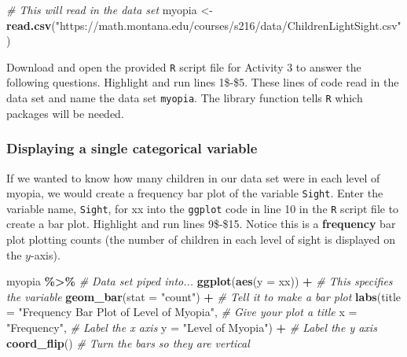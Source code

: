 \documentclass[
]{report}
\newenvironment{Shaded}{\begin{snugshade}}{\end{snugshade}}
\newcommand{\CommentTok}[1]{\textcolor[rgb]{0.56,0.35,0.01}{\textit{#1}}}
\newcommand{\DataTypeTok}[1]{\textcolor[rgb]{0.13,0.29,0.53}{#1}}
\newcommand{\KeywordTok}[1]{\textcolor[rgb]{0.13,0.29,0.53}{\textbf{#1}}}
\newcommand{\NormalTok}[1]{#1}
\newcommand{\OperatorTok}[1]{\textcolor[rgb]{0.81,0.36,0.00}{\textbf{#1}}}
\newcommand{\StringTok}[1]{\textcolor[rgb]{0.31,0.60,0.02}{#1}}
\begin{document}
\begin{Shaded}
\begin{Highlighting}[]
\CommentTok{\# This will read in the data set}
\NormalTok{myopia \textless{}{-}}\StringTok{ }\KeywordTok{read.csv}\NormalTok{(}\StringTok{"https://math.montana.edu/courses/s216/data/ChildrenLightSight.csv"}\NormalTok{) }
\end{Highlighting}
\end{Shaded}

Download and open the provided \texttt{R} script file for Activity 3 to answer the following questions. Highlight and run lines 1\$-\$5. These lines of code read in the data set and name the data set \texttt{myopia}. The library function tells \texttt{R} which packages will be needed.

\hypertarget{displaying-a-single-categorical-variable}{%
\subsubsection*{Displaying a single categorical variable}\label{displaying-a-single-categorical-variable}}

If we wanted to know how many children in our data set were in each level of myopia, we would create a frequency bar plot of the variable \texttt{Sight}. Enter the variable name, \texttt{Sight}, for xx into the \texttt{ggplot} code in line 10 in the \texttt{R} script file to create a bar plot. Highlight and run lines 9\$-\$15. Notice this is a \textbf{frequency} bar plot plotting counts (the number of children in each level of sight is displayed on the \(y\)-axis).

\begin{Shaded}
\begin{Highlighting}[]
\NormalTok{myopia }\OperatorTok{\%\textgreater{}\%}\StringTok{ }\CommentTok{\# Data set piped into...}
\KeywordTok{ggplot}\NormalTok{(}\KeywordTok{aes}\NormalTok{(}\DataTypeTok{y =}\NormalTok{ xx)) }\OperatorTok{+}\StringTok{   }\CommentTok{\# This specifies the variable}
\StringTok{  }\KeywordTok{geom\_bar}\NormalTok{(}\DataTypeTok{stat =} \StringTok{"count"}\NormalTok{) }\OperatorTok{+}\StringTok{  }\CommentTok{\# Tell it to make a bar plot}
\StringTok{  }\KeywordTok{labs}\NormalTok{(}\DataTypeTok{title =} \StringTok{"Frequency Bar Plot of Level of Myopia"}\NormalTok{,  }\CommentTok{\# Give your plot a title}
       \DataTypeTok{x =} \StringTok{"Frequency"}\NormalTok{,   }\CommentTok{\# Label the x axis}
       \DataTypeTok{y =} \StringTok{"Level of Myopia"}\NormalTok{)  }\OperatorTok{+}\StringTok{ }\CommentTok{\# Label the y axis}
\StringTok{  }\KeywordTok{coord\_flip}\NormalTok{()  }\CommentTok{\# Turn the bars so they are vertical}
\end{Highlighting}
\end{Shaded}
\end{document}
